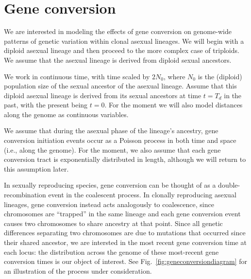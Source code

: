 \documentclass{article}
\begin{document}
\section{Gene conversion}

We are interested in modeling the effects of gene conversion on genome-wide
patterns of genetic variation within clonal asexual lineages. We will begin
with a diploid asexual lineage and then proceed to the more complex case of
triploids. We assume that the asexual lineage is derived from diploid sexual
ancestors.

We work in continuous time, with time scaled by $2N_0$, where $N_0$ is the
(diploid) population size of the sexual ancestor of the asexual lineage. Assume
that this diploid asexual lineage is derived from its sexual ancestors at time
$t=T_d$ in the past, with the present being $t=0$. For the moment we will also
model distances along the genome as continuous variables.

We assume that during the asexual phase of the lineage's ancestry, gene
conversion initiation events occur as a Poisson process in both time and space
(i.e., along the genome).  For the moment, we also assume that each gene
conversion tract is exponentially distributed in length, although we will
return to this assumption later.

In sexually reproducing species, gene conversion can be thought of as a
double-recombination event in the coalescent process. In clonally reproducing
asexual lineages, gene conversion instead acts analogously to coalescence,
since chromosomes are ``trapped'' in the same lineage and each gene conversion
event causes two chromosomes to share ancestry at that point. Since all genetic
differences separating two chromosomes are due to mutations that occurred since
their shared ancestor, we are intersted in the most recent gene conversion time
at each locus: the distribution across the genome of these most-recent gene
conversion times is our object of interest.  See
Fig.~\ref{fig:geneconversiondiagram} for an illustration of the process under
consideration.
\end{document}
